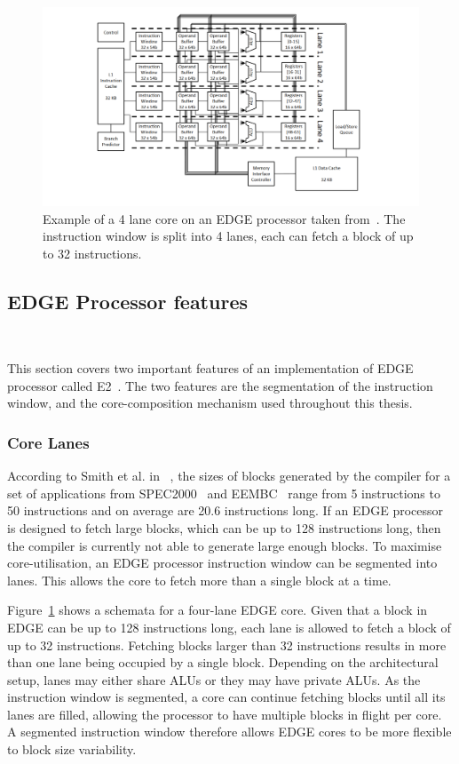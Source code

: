  \begin{figure}[t]
 \center
 \includegraphics[width=1\textwidth]{background/graphics/edge_lanes.pdf}
 \caption{Example of a 4 lane core on an EDGE processor taken from~\cite{putnam2010e2}. The instruction window is split into 4 lanes, each can fetch a block of up to 32 instructions.}\label{fig:e2segment}
\vspace{-0.5em}
 \end{figure}

\subsection{EDGE Processor features}~\label{sec:edge_arch}

This section covers two important features of an implementation of EDGE processor called E2~\cite{putnam2010e2}.
The two features are the segmentation of the instruction window, and the core-composition mechanism used throughout this thesis.

\subsubsection{Core Lanes} 

According to Smith et al. in ~\cite{smith2006edge}, the sizes of blocks generated by the compiler for a set of applications from SPEC2000~\cite{spec2000} and EEMBC~\cite{eembc} range from 5 instructions to 50 instructions and on average are 20.6 instructions long.
If an EDGE processor is designed to fetch large blocks, which can be up to 128 instructions long, then the compiler is currently not able to generate large enough blocks.
To maximise core-utilisation, an EDGE processor instruction window can be segmented into lanes.
This allows the core to fetch more than a single block at a time.

Figure~\ref{fig:e2segment} shows a schemata for a four-lane EDGE core.
Given that a block in EDGE can be up to 128 instructions long, each lane is allowed to fetch a block of up to 32 instructions.
Fetching blocks larger than 32 instructions results in more than one lane being occupied by a single block.
Depending on the architectural setup, lanes may either share ALUs or they may have private ALUs.
As the instruction window is segmented, a core can continue fetching blocks until all its lanes are filled, allowing the processor to have multiple blocks in flight per core.
A segmented instruction window therefore allows EDGE cores to be more flexible to block size variability.

